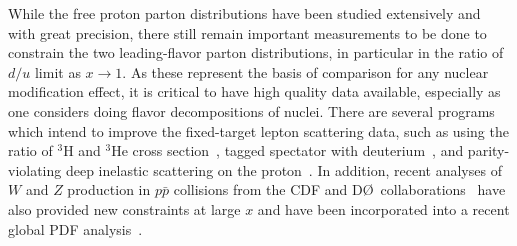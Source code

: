 While the free proton parton distributions have been studied extensively and with great precision, there still remain important measurements to be done to constrain the two leading-flavor parton distributions, in particular in the ratio of $d/u$ limit as $x \rightarrow 1$.  As these represent the basis of comparison for any nuclear modification effect, it is critical to have high quality data available, especially as one considers doing flavor decompositions of nuclei.  There are several programs which intend to improve the fixed-target lepton scattering data, such as using the ratio of ${}^{3}$H and ${}^{3}$He cross section~\cite{mar}, tagged spectator with deuterium~\cite{bonus12}, and parity-violating deep inelastic scattering on the proton~\cite{solid_pvdis}.  In addition, recent analyses of $W$ and $Z$ production in $p\bar{p}$ collisions from the CDF and D\O\ collaborations~\cite{D0:2014kma,Abazov:2013dsa,Acosta:2005ud,Aaltonen:2009ta,Aaltonen:2010zza,Abazov:2007jy} have also provided new constraints at large $x$ and have been incorporated into a recent global PDF analysis~\cite{Accardi:2016qay}.

